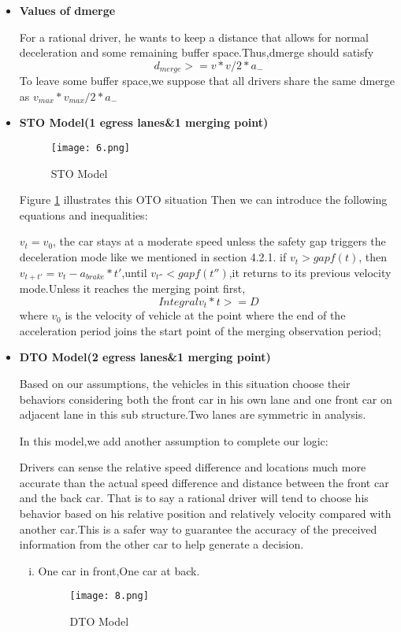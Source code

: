 \begin{itemize}
	\item{\textbf{Values of dmerge}}

	For a rational driver, he wants to keep a distance that allows for normal deceleration and some remaining buffer space.Thus,dmerge should satisfy 
           $$d_{merge}>=v*v/2*a_-$$
	To leave some buffer space,we suppose that all drivers share the same dmerge as $v_{max}*v_{max}/2*a_-$

	\item{\textbf{STO Model(1 egress lanes\&1 merging point)}}

	\begin{figure}[h]
	\centering
	\texttt{[image: 6.png]}
	\caption{STO Model}
	\label{3}
	\end{figure}

	Figure \ref{3} illustrates this OTO situation
	Then we can introduce the following equations and inequalities:

	$v_t=v_0$, the car stays at a moderate speed unless the safety gap triggers the deceleration mode like we mentioned in section 4.2.1.
	if $v_t>gapf(t)$, then $v_{t+t'}=v_t-a_{brake}*t'$,until $v_{t''}<gapf(t'')$,it returns to its previous velocity mode.Unless it reaches the merging point first,
      $$Integral v_t*t>=D$$
	where $v_0$ is the velocity of vehicle at the point where the end of the acceleration period joins the start point of the merging observation period;

	\item{\textbf{DTO Model(2 egress lanes\&1 merging point)}}

	Based on our assumptions, the vehicles in this situation choose their behaviors considering both the front car in his own lane and one front car on adjacent lane in this sub structure.Two lanes are symmetric in analysis.

	In this model,we add another assumption to complete our logic:

	Drivers can sense the relative speed difference and locations much more accurate than the actual speed difference and distance between the front car and the back car. That is to say a rational driver will tend to choose his behavior based on his relative position and relatively velocity compared with another car.This is a safer way to guarantee the accuracy of the preceived information from the other car to help generate a decision.

	\begin{enumerate}[i)]
		\item
		One car in front,One car at back.
	\begin{figure}[h]
	\centering
	\texttt{[image: 8.png]}
	\caption{DTO Model}
	\label{4}
	\end{figure}


\end{enumerate}
\end{itemize}

